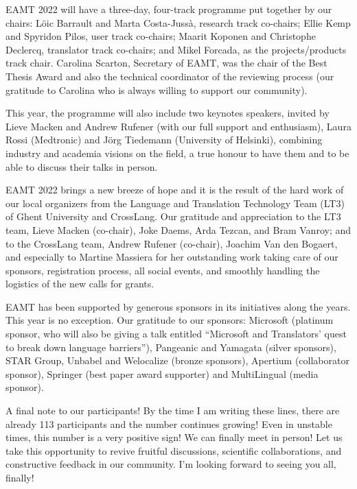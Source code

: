 \documentclass[a4paper,11pt,twoside]{book}
\begin{document}
\begin{onehalfspacing}
EAMT 2022 will have a three-day, four-track programme put together by our chairs: Löic Barrault and Marta Costa-Jussà, research track co-chairs; Ellie Kemp and Spyridon Pilos, user track co-chairs; Maarit Koponen and Christophe Declercq, translator track co-chairs; and Mikel Forcada, as the projects/products track chair. Carolina Scarton, Secretary of EAMT, was the chair of the Best Thesis Award and also the technical coordinator of the reviewing process (our gratitude to Carolina who is always willing to support our community).

This year, the programme will also include two keynotes speakers, invited by Lieve Macken and Andrew Rufener (with our full support and enthusiasm), Laura Rossi (Medtronic) and Jörg Tiedemann (University of Helsinki), combining industry and academia visions on the field, a true honour to have them and to be able to discuss their talks in person.

EAMT 2022 brings a new breeze of hope and it is the result of the hard work of our local organizers from the Language and Translation Technology Team (LT3) of Ghent University and CrossLang. Our gratitude and appreciation to the LT3 team, Lieve Macken (co-chair), Joke Daems, Arda Tezcan, and Bram Vanroy; and to the CrossLang team, Andrew Rufener (co-chair), Joachim Van den Bogaert, and especially to Martine Massiera for her outstanding work taking care of our sponsors, registration process, all social events, and smoothly handling the logistics of the new calls for grants. 

EAMT has been supported by generous sponsors in its initiatives along the years. This year is no exception. Our gratitude to our sponsors: Microsoft (platinum sponsor, who will also be giving a talk entitled ``Microsoft and Translators' quest to break down language barriers''), Pangeanic and Yamagata (silver sponsors), STAR Group, Unbabel and Welocalize (bronze sponsors), Apertium (collaborator sponsor), Springer (best paper award supporter) and MultiLingual (media sponsor).

A final note to our participants! By the time I am writing these lines, there are already 113 participants and the number continues growing! Even in unstable times, this number is a very positive sign! We can finally meet in person! Let us take this opportunity to revive fruitful discussions, scientific collaborations, and constructive feedback in our community. I'm looking forward to seeing you all, finally!


\end{onehalfspacing}
\end{document}
